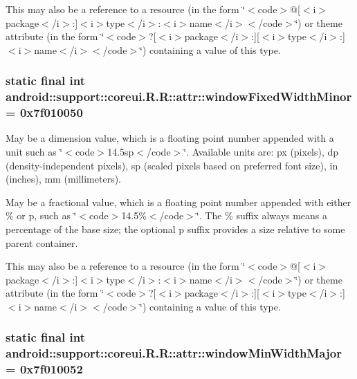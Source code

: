 This may also be a reference to a resource (in the form \char`\"{}$<$code$>$@\mbox{[}$<$i$>$package$<$/i$>$:\mbox{]}$<$i$>$type$<$/i$>$:$<$i$>$name$<$/i$>$$<$/code$>$\char`\"{}) or theme attribute (in the form \char`\"{}$<$code$>$?\mbox{[}$<$i$>$package$<$/i$>$:\mbox{]}\mbox{[}$<$i$>$type$<$/i$>$:\mbox{]}$<$i$>$name$<$/i$>$$<$/code$>$\char`\"{}) containing a value of this type. \hypertarget{classandroid_1_1support_1_1coreui_1_1_r_1_1attr_288aa3980f226257e5335c221bfd0e26}{
\subsubsection[{windowFixedWidthMinor}]{\setlength{\rightskip}{0pt plus 5cm}static final int android::support::coreui.R.R::attr::windowFixedWidthMinor = 0x7f010050}}
\label{classandroid_1_1support_1_1coreui_1_1_r_1_1attr_288aa3980f226257e5335c221bfd0e26}


May be a dimension value, which is a floating point number appended with a unit such as \char`\"{}$<$code$>$14.5sp$<$/code$>$\char`\"{}. Available units are: px (pixels), dp (density-independent pixels), sp (scaled pixels based on preferred font size), in (inches), mm (millimeters). 

May be a fractional value, which is a floating point number appended with either \% or p, such as \char`\"{}$<$code$>$14.5\%$<$/code$>$\char`\"{}. The \% suffix always means a percentage of the base size; the optional p suffix provides a size relative to some parent container. 

This may also be a reference to a resource (in the form \char`\"{}$<$code$>$@\mbox{[}$<$i$>$package$<$/i$>$:\mbox{]}$<$i$>$type$<$/i$>$:$<$i$>$name$<$/i$>$$<$/code$>$\char`\"{}) or theme attribute (in the form \char`\"{}$<$code$>$?\mbox{[}$<$i$>$package$<$/i$>$:\mbox{]}\mbox{[}$<$i$>$type$<$/i$>$:\mbox{]}$<$i$>$name$<$/i$>$$<$/code$>$\char`\"{}) containing a value of this type. \hypertarget{classandroid_1_1support_1_1coreui_1_1_r_1_1attr_11a035840f46f9af985036156484e3f4}{
\subsubsection[{windowMinWidthMajor}]{\setlength{\rightskip}{0pt plus 5cm}static final int android::support::coreui.R.R::attr::windowMinWidthMajor = 0x7f010052}}
\label{classandroid_1_1support_1_1coreui_1_1_r_1_1attr_11a035840f46f9af985036156484e3f4}


